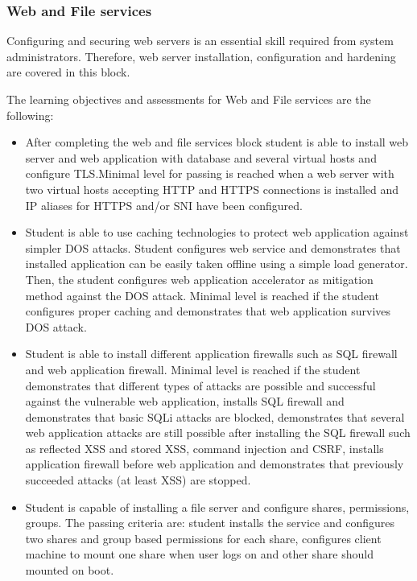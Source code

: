 \subsubsection{Web and File services}
Configuring and securing web servers is an essential skill required from system administrators. Therefore, web server installation, configuration and hardening are covered in this block.

The learning objectives and assessments for Web and File services are the following:
\begin{itemize}
\item After completing the web and file services block student is able to install web server and web application with database and several virtual hosts and configure \gls{TLS}.Minimal level for passing is reached when a web server with two virtual hosts accepting \gls{HTTP} and \gls{HTTPS} connections is installed and IP aliases for  \gls{HTTPS} and/or \gls{SNI} have been configured.
\item Student is able to use caching technologies to protect web application against simpler \gls{DOS} attacks. Student configures web service and demonstrates that installed application can be easily taken offline using a simple load generator. Then, the student configures web application accelerator as mitigation method against the  \gls{DOS} attack.  Minimal level is reached if the student configures proper caching and demonstrates that web application survives \gls{DOS} attack.
\item Student is able to install different application firewalls such as \gls{SQL} firewall and web application firewall. Minimal level is reached if the student demonstrates that different types of attacks are possible and successful against the vulnerable web application, installs \gls{SQL} firewall and demonstrates that basic \gls{SQLi} attacks are blocked, demonstrates that several web application attacks are still possible after installing the \gls{SQL} firewall such as reflected \gls{XSS} and stored \gls{XSS}, command injection and \gls{CSRF}, installs application firewall before web application and demonstrates that previously succeeded attacks (at least \gls{XSS}) are stopped.
\item Student is capable of installing a file server and configure shares, permissions, groups. The passing criteria are: student installs the service and configures two shares and group based permissions for each share, configures client machine to mount one share when user logs on and other share should mounted on boot.\end{itemize}


